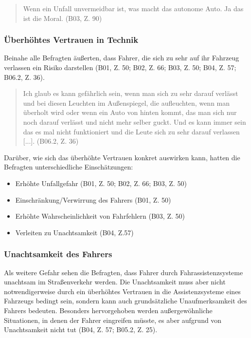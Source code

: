 \documentclass[12pt]{article}
\begin{document}
\begin{quote}
  Wenn ein Unfall unvermeidbar ist, was macht das autonome Auto. Ja das ist die Moral. (B03, Z. 90)
\end{quote}

\subsubsection*{Überhöhtes Vertrauen in Technik}
Beinahe alle Befragten äußerten, dass Fahrer, die sich zu sehr auf ihr Fahrzeug verlassen ein Risiko darstellen (B01, Z. 50; B02, Z. 66; B03, Z. 50; B04, Z. 57; B06.2, Z. 36).

\begin{quote}
  Ich glaub es kann gefährlich sein, wenn man sich zu sehr darauf verlässt und bei diesen Leuchten im Außenspiegel, die aufleuchten, wenn man überholt wird oder wenn ein Auto von hinten kommt, das man sich nur noch darauf verlässt und nicht mehr selber guckt. Und es kann immer sein das es mal nicht funktioniert und die Leute sich zu sehr darauf verlassen [...]. (B06.2, Z. 36)
\end{quote}

Darüber, wie sich das überhöhte Vertrauen konkret auswirken kann, hatten die Befragten unterschiedliche Einschätzungen:
\begin{itemize}
  \item Erhöhte Unfallgefahr (B01, Z. 50; B02, Z. 66; B03, Z. 50)
  \item Einschränkung/Verwirrung des Fahrers (B01, Z. 50)
  \item Erhöhte Wahrscheinlichkeit von Fahrfehlern (B03, Z. 50)
  \item Verleiten zu Unachtsamkeit (B04, Z.57)
\end{itemize}

\subsubsection*{Unachtsamkeit des Fahrers}
Als weitere Gefahr sehen die Befragten, dass Fahrer durch Fahrassistenzsysteme unachtsam im Straßenverkehr werden. Die Unachtsamkeit muss aber nicht notwendigerweise durch ein überhöhtes Vertrauen in die Assistenzsysteme eines Fahrzeugs bedingt sein, sondern kann auch grundsätzliche Unaufmerksamkeit des Fahrers bedeuten. Besonders hervorgehoben werden außergewöhnliche Situationen, in denen der Fahrer eingreifen müsste, es aber aufgrund von Unachtsamkeit nicht tut (B04, Z. 57; B05.2, Z. 25).
\end{document}

